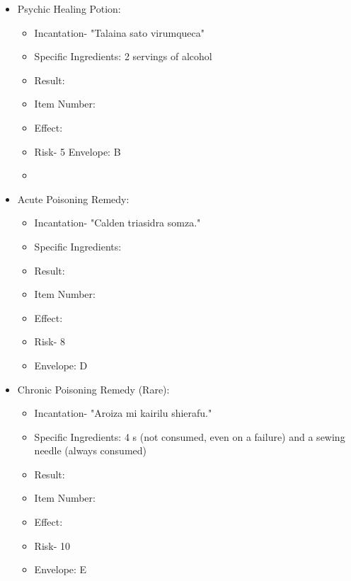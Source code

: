 \documentclass[green]{Kos}
\begin{document}
\begin{itemize}

\item Psychic Healing Potion:
\begin{itemize}
\item Incantation- "Talaina sato virumqueca"
\item Specific Ingredients: 2 servings of alcohol
\item Result: \iPsychicHealthRemedy{\MYname}
\item Item Number: \iPsychicHealthRemedy{\MYnumber}
\item Effect: \iPsychicHealthRemedy{\MYtext}
\item Risk- 5
Envelope: B
\item
\end{itemize}
\item Acute Poisoning Remedy:
\begin{itemize}
\item Incantation- "Calden triasidra somza."
\item Specific Ingredients: \iHerbs{}
\item Result: \iAcutePoisonRemedy{\MYname}
\item Item Number: \iAcutePoisonRemedy{\MYnumber}
\item Effect: \iAcutePoisonRemedy{\MYtext}
\item Risk- 8
\item Envelope: D
\end{itemize}

\item Chronic Poisoning Remedy (Rare):
\begin{itemize}
\item Incantation- "Aroiza mi kairilu shierafu."
\item Specific Ingredients: 4 \iEmerald{\MYname}s (not consumed, even on a failure) and a sewing needle (always consumed)
\item Result: \iChronicPoisonRemedy{\MYname}
\item Item Number: \iChronicPoisonRemedy{\MYnumber}
\item Effect: \iChronicPoisonRemedy{\MYtext}
\item Risk- 10
\item Envelope: E
\end{itemize}
\end{itemize}
\end{document}
